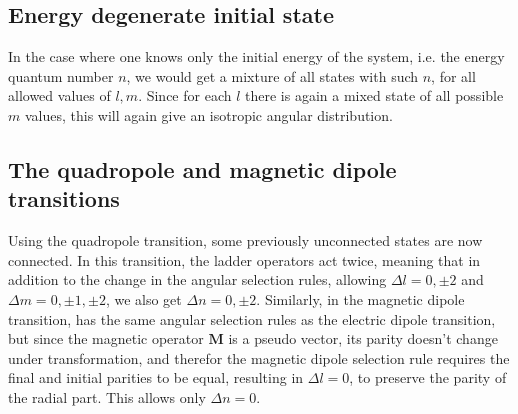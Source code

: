 \documentclass{article}
\begin{document}
\subsection{Energy degenerate initial state}
In the case where one knows only the initial energy of the system, i.e. the energy quantum number $n$, we would get a mixture of all states with such $n$, for all allowed values of $l, m$. Since for each $l$ there is again a mixed state of all possible $m$ values, this will again give an isotropic angular distribution.

\subsection{The quadropole and magnetic dipole transitions}
Using the quadropole transition, some previously unconnected states are now connected. In this transition, the ladder operators act twice, meaning that in addition to the change in the angular selection rules, allowing $\Delta l = 0, \pm 2$ and $\Delta m = 0, \pm 1, \pm 2$, we also get $\Delta n = 0, \pm 2$.
\newline
Similarly, in the magnetic dipole transition, has the same angular selection rules as the electric dipole transition, but since the magnetic operator $\boldsymbol{M}$ is a pseudo vector, its parity doesn't change under transformation, and therefor the magnetic dipole selection rule requires the final and initial parities to be equal, resulting in $\Delta l = 0$, to preserve the parity of the radial part. This allows only $\Delta n = 0$.
\end{document}
